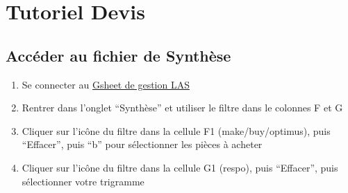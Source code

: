 \section{Tutoriel Devis}

\subsection{Accéder au fichier de Synthèse}
\begin{enumerate}
	\item Se connecter au   \href{https://docs.google.com/spreadsheets/d/1zmN-TiNXafv8fsJI3vR6wi9P5roOi5zo0ymeUQcS7vQ/edit?usp=sharing}{Gsheet de gestion LAS} 
	
	\item Rentrer dans l’onglet “Synthèse” et utiliser le filtre dans le colonnes F et G\\
	
	\item Cliquer sur l'icône du filtre dans la cellule F1 (make/buy/optimus), puis “Effacer”, puis “b” pour sélectionner les pièces à acheter
	\item Cliquer sur l’icône du filtre dans la cellule G1 (respo), puis “Effacer”, puis sélectionner votre trigramme
	
\end{enumerate}

